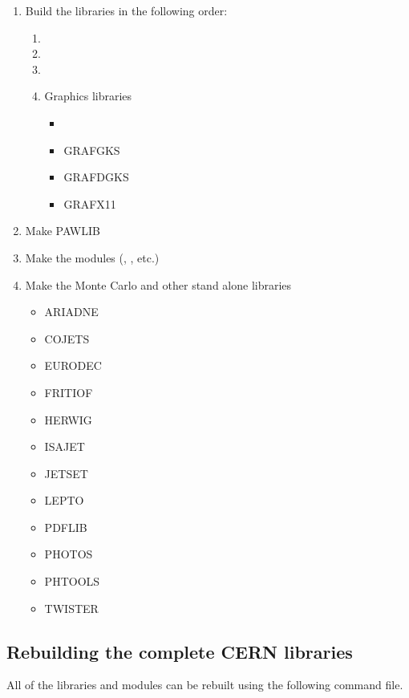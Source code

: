 \begin{enumerate}
\item
Build the libraries in the following order:
\begin{enumerate}
\item
\KERNLIB{}
\item
\MATHLIB{}
\item
\PACKLIB{}
\item
Graphics libraries
\begin{itemize}
\item
\GRAFLIB{}
\item
GRAFGKS
\item
GRAFDGKS
\item
GRAFX11
\end{itemize}
\end{enumerate}
\item
Make PAWLIB
\item
Make the modules (\PAW{}, \FATMEN{}, \HEPDB{} etc.)
\item
Make the Monte Carlo and other stand alone libraries
\begin{itemize}
\item
ARIADNE
\item
COJETS
\item
EURODEC
\item
FRITIOF
\item
HERWIG
\item
ISAJET
\item
JETSET
\item
LEPTO
\item
PDFLIB
\item
PHOTOS
\item
PHTOOLS
\item
TWISTER
\end{itemize}
\end{enumerate}

\subsection{Rebuilding the complete CERN libraries}

All of the libraries and modules can be rebuilt using the following
command file.


